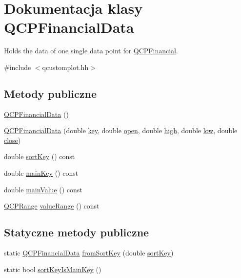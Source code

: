 \hypertarget{class_q_c_p_financial_data}{}\section{Dokumentacja klasy Q\+C\+P\+Financial\+Data}
\label{class_q_c_p_financial_data}


Holds the data of one single data point for \hyperlink{class_q_c_p_financial}{Q\+C\+P\+Financial}.  




{\ttfamily \#include $<$qcustomplot.\+hh$>$}

\subsection*{Metody publiczne}
\begin{DoxyCompactItemize}
\item 
\hyperlink{class_q_c_p_financial_data_a1ca53b3a9ae4e9658a4fd1ca57d76ba4}{Q\+C\+P\+Financial\+Data} ()
\item 
\hyperlink{class_q_c_p_financial_data_a069b72c514dfd4fc8e1d5df811e54ca4}{Q\+C\+P\+Financial\+Data} (double \hyperlink{class_q_c_p_financial_data_a18bc92126f28c214b05b0161e5f5958b}{key}, double \hyperlink{class_q_c_p_financial_data_a3059e1e1fbcb9fd243fde0450f238032}{open}, double \hyperlink{class_q_c_p_financial_data_a299a4b241296fb6cd1baf5ab03f7126a}{high}, double \hyperlink{class_q_c_p_financial_data_aecce0fb45a115e3f3a25eea78491ac16}{low}, double \hyperlink{class_q_c_p_financial_data_a45e9b96944c4a08ea6c82a72d3d22df2}{close})
\item 
double \hyperlink{class_q_c_p_financial_data_a5e6f6218e3254119355b32d133b03e06}{sort\+Key} () const 
\item 
double \hyperlink{class_q_c_p_financial_data_a91ab5dfe37795a87719f8236c203e5aa}{main\+Key} () const 
\item 
double \hyperlink{class_q_c_p_financial_data_a409cea4fc683803ba70789f7f98ce7f5}{main\+Value} () const 
\item 
\hyperlink{class_q_c_p_range}{Q\+C\+P\+Range} \hyperlink{class_q_c_p_financial_data_a419360904ff00521dd96d53f3d672849}{value\+Range} () const 
\end{DoxyCompactItemize}
\subsection*{Statyczne metody publiczne}
\begin{DoxyCompactItemize}
\item 
static \hyperlink{class_q_c_p_financial_data}{Q\+C\+P\+Financial\+Data} \hyperlink{class_q_c_p_financial_data_a54a0ca7ee7fd7713972477e8e2533ce5}{from\+Sort\+Key} (double \hyperlink{class_q_c_p_financial_data_a5e6f6218e3254119355b32d133b03e06}{sort\+Key})
\item 
static bool \hyperlink{class_q_c_p_financial_data_a1121db9420a7694144f6a99b09257a5f}{sort\+Key\+Is\+Main\+Key} ()
\end{DoxyCompactItemize}
